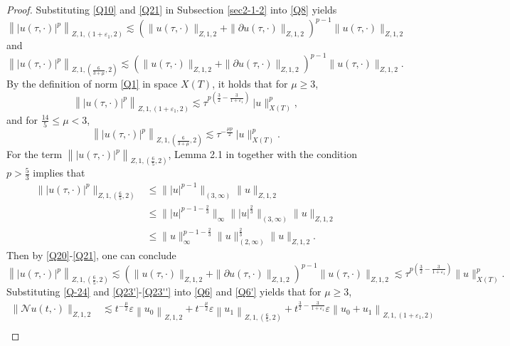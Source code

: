 \documentclass[11pt,twoside]{article}
\newcommand{\p}{\partial}
\newcommand{\ve}{\varepsilon}
\newcommand{\f}{\frac}
\theoremstyle{plain}
\theoremstyle{definition}
\theoremstyle{remark}
\numberwithin{equation}{section}
\begin{document}
\begin{proof}
Substituting \eqref{Q10} and \eqref{Q21} in Subsection \ref{sec2-1-2} into \eqref{Q8} yields
$$
\left\||u(\tau, \cdot)|^p\right\|_{Z, 1,(1+\varepsilon_1, 2)} \lesssim  (\|u(\tau, \cdot)\|_{Z, 1, 2}+\|\p u(\tau, \cdot)\|_{Z, 1, 2})^{p-1}\|u(\tau, \cdot)\|_{Z, 1,2}
$$
and
$$
\left\||u(\tau, \cdot)|^p\right\|_{Z, 1,(\f{6}{3+\mu}, 2)} \lesssim  (\|u(\tau, \cdot)\|_{Z, 1, 2}+\|\p u(\tau, \cdot)\|_{Z, 1, 2})^{p-1}\|u(\tau, \cdot)\|_{Z, 1,2}.
$$
By the definition of norm \eqref{Q1} in space $X(T)$, it holds that for $\mu\geq3$,
\begin{equation}\label{Q23'}
\left\||u(\tau, \cdot)|^p\right\|_{Z, 1,(1+\varepsilon_1, 2)}\lesssim \tau^{p(\f32-\f{3}{1+\ve_1})}\ |u\|_{X(T)}^{p},
\end{equation}
and for $\f{14}{5}\leq\mu<3$,
\begin{equation}\label{Q23''}
\left\||u(\tau, \cdot)|^p\right\|_{Z, 1,(\f{6}{3+\mu}, 2)}\lesssim \tau^{-\f{\mu p}{2}}\ |u\|_{X(T)}^{p}.
\end{equation}
For the term $\left\||u(\tau, \cdot)|^p\right\|_{Z, 1,(\f65, 2)}$,
Lemma 2.1 in \cite{LX} together with the condition  $p>\f53$ implies that
\begin{equation}\label{Q23}
\begin{aligned}
\||u(\tau, \cdot)|^p\|_{Z, 1, (\f65, 2)}&\leq \||u|^{p-1}\|_{(3, \infty)}\|u\|_{Z, 1, 2}\\
&\leq  \||u|^{p-1-\f23}\|_{\infty}\||u|^{\f23}\|_{(3, \infty)}  \|u\|_{Z, 1, 2}\\
&\leq  \|u\|^{p-1-\f23}_{\infty}\|u\|^{\f23}_{(2, \infty)}  \|u\|_{Z, 1, 2}.
\end{aligned}
\end{equation}
Then by \eqref{Q20}-\eqref{Q21}, one can conclude
\begin{equation}\label{Q-24}
\left\||u(\tau, \cdot)|^p\right\|_{Z, 1,(\f65, 2)}\lesssim  (\|u(\tau, \cdot)\|_{Z, 1, 2}+\|\p u(\tau, \cdot)\|_{Z, 1, 2})^{p-1}\|u(\tau, \cdot)\|_{Z, 1,2}\lesssim \tau^{p(\f32-\f{3}{1+\ve_1})}\|u\|_{X(T)}^{p}.
\end{equation}
Substituting \eqref{Q-24} and \eqref{Q23'}-\eqref{Q23''} into \eqref{Q6} and \eqref{Q6'}  yields that for $\mu\geq3$,
\begin{equation}\label{Q25}
\begin{aligned}
\|\mathcal{N} u(t, \cdot)\|_{Z, 1, 2} &\lesssim t^{-\f{\mu}{2}}\ve\left\|u_0\right\|_{Z, 1, 2}
+t^{-\f{\mu}{2}}\ve\left\|u_1\right\|_{Z, 1,(\f65, 2)}
+t^{\f32-\f{3}{1+\ve_1}}\ve\left\|u_0+u_1\right\|_{Z, 1,(1+\varepsilon_1, 2)}\\

\end{aligned}
\end{equation}
\end{proof}
\end{document}
